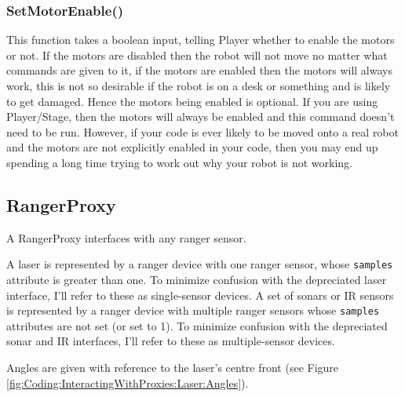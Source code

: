 \documentclass[a4paper]{report}
\newcommand{\plst}{Player/Stage\xspace}
\newcommand{\pl}{Player\xspace}
\begin{document}
\subsubsection{SetMotorEnable()}
This function takes a boolean input, telling \pl whether to enable the
motors or not. If the motors are disabled then the robot will not move no
matter what commands are given to it, if the motors are enabled then the
motors will always work, this is not so desirable if the robot is on a desk
or something and is likely to get damaged. Hence the motors being enabled
is optional. If you are using \plst, then the motors will always be enabled
and this command doesn't need to be run. However, if your code is ever
likely to be moved onto a real robot and the motors are not explicitly
enabled in your code, then you may end up spending a long time trying to
work out why your robot is not working.

\subsection{RangerProxy}\label{sec:Coding:InteractingWithProxies:ranger}
A RangerProxy interfaces with any ranger sensor.  

A laser is represented by a ranger device with one ranger sensor, whose
{\tt samples} attribute is greater than one.  To minimize confusion with
the depreciated laser interface, I'll refer to these as single-sensor
devices.  A set of sonars or IR sensors is represented by a ranger device
with multiple ranger sensors whose {\tt samples} attributes are not set (or
set to 1).  To minimize confusion with the depreciated sonar and IR
interfaces, I'll refer to these as multiple-sensor devices.


Angles are given with reference to the laser's centre front (see Figure
\ref{fig:Coding:InteractingWithProxies:Laser:Angles}).
\end{document}
